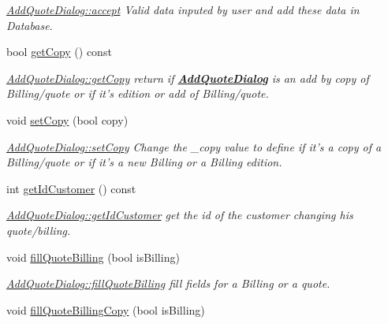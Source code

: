 \begin{DoxyCompactItemize}
\begin{DoxyCompactList}\small\item\em \hyperlink{classGui_1_1Dialogs_1_1AddQuoteDialog_abcc6fc79a513dd1765a4494d9499586b}{Add\-Quote\-Dialog\-::accept} Valid data inputed by user and add these data in Database. \end{DoxyCompactList}\item 
bool \hyperlink{classGui_1_1Dialogs_1_1AddQuoteDialog_a343bac79889747e55412d11bd2e27cbb}{get\-Copy} () const 
\begin{DoxyCompactList}\small\item\em \hyperlink{classGui_1_1Dialogs_1_1AddQuoteDialog_a343bac79889747e55412d11bd2e27cbb}{Add\-Quote\-Dialog\-::get\-Copy} return if {\bfseries \hyperlink{classGui_1_1Dialogs_1_1AddQuoteDialog}{Add\-Quote\-Dialog}} is an add by copy of Billing/quote or if it's edition or add of Billing/quote. \end{DoxyCompactList}\item 
void \hyperlink{classGui_1_1Dialogs_1_1AddQuoteDialog_add29bc442ab7783f062b594a97fc8270}{set\-Copy} (bool copy)
\begin{DoxyCompactList}\small\item\em \hyperlink{classGui_1_1Dialogs_1_1AddQuoteDialog_add29bc442ab7783f062b594a97fc8270}{Add\-Quote\-Dialog\-::set\-Copy} Change the {\itshape \-\_\-copy} value to define if it's a copy of a Billing/quote or if it's a new Billing or a Billing edition. \end{DoxyCompactList}\item 
int \hyperlink{classGui_1_1Dialogs_1_1AddQuoteDialog_a66985973f98f553545a138d6abfe148b}{get\-Id\-Customer} () const 
\begin{DoxyCompactList}\small\item\em \hyperlink{classGui_1_1Dialogs_1_1AddQuoteDialog_a66985973f98f553545a138d6abfe148b}{Add\-Quote\-Dialog\-::get\-Id\-Customer} get the id of the customer changing his quote/billing. \end{DoxyCompactList}\item 
void \hyperlink{classGui_1_1Dialogs_1_1AddQuoteDialog_ac4c7b242d3340b1b03d0d5bac12b0100}{fill\-Quote\-Billing} (bool is\-Billing)
\begin{DoxyCompactList}\small\item\em \hyperlink{classGui_1_1Dialogs_1_1AddQuoteDialog_ac4c7b242d3340b1b03d0d5bac12b0100}{Add\-Quote\-Dialog\-::fill\-Quote\-Billing} fill fields for a Billing or a quote. \end{DoxyCompactList}\item 
\hypertarget{classGui_1_1Dialogs_1_1AddQuoteDialog_a3fcb23cd52dd2cd9a4b607844c4bd9cd}{void \hyperlink{classGui_1_1Dialogs_1_1AddQuoteDialog_a3fcb23cd52dd2cd9a4b607844c4bd9cd}{fill\-Quote\-Billing\-Copy} (bool is\-Billing)}\label{classGui_1_1Dialogs_1_1AddQuoteDialog_a3fcb23cd52dd2cd9a4b607844c4bd9cd}


\end{DoxyCompactItemize}
